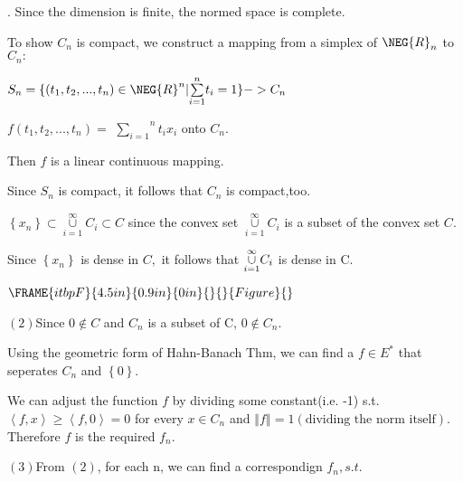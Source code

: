 \documentclass{article}
\begin{document}

. Since the dimension is finite, the normed space is complete.

To show $C_{n}$ is compact, we construct a mapping from a simplex of $\NEG%
{R}_{n}$ to $C_{n}:$

$S_{n}=\{\left( t_{1},t_{2},...,t_{n}\right) \in \NEG{R}^{n}|\overset{n}{%
\underset{i=1}{\sum }}t_{i}=1\}->C_{n}$

$f\left( t_{1},t_{2},...,t_{n}\right) =$ $\overset{n}{\underset{i=1}{\sum }}%
t_{i}x_{i}$ onto $C_{n}.$

Then $f$ is a linear continuous mapping.

Since $S_{n}$ is compact, it follows that $C_{n}$ is compact,too. 

$\left\{ x_{n}\right\} \subset \underset{i=1}{\overset{\infty }{\cup }}%
C_{i}\subset C$ since the convex set $\underset{i=1}{\overset{\infty }{\cup }%
}C_{i}$ is a subset of the convex set $C.$

Since $\left\{ x_{n}\right\} $ is dense in $C,$ it follows that $\underset{%
i=1}{\overset{\infty }{\cup }}C_{i}$ is dense in C.

$\FRAME{itbpF}{4.5in}{0.9in}{0in}{}{}{Figure}{\special{language "Scientific
Word";type "GRAPHIC";maintain-aspect-ratio TRUE;display "USEDEF";valid_file
"T";width 4.5in;height 0.9in;depth 0in;original-width
7.9321in;original-height 1.2496in;cropleft "0";croptop "1";cropright
"1";cropbottom "0";tempfilename 'NVOLAN01.wmf';tempfile-properties "XPR";}}$

$\left( 2\right) $Since $0\notin C$ and $C_{n}$ is a subset of C, 0$\notin
C_{n}.$

Using the geometric form of Hahn-Banach Thm, we can find a $f\in E^{\ast }$
that seperates $C_{n}$ and $\left\{ 0\right\} .$

We can adjust the function $f$ by dividing some constant(i.e. -1) s.t. $%
\left\langle f,x\right\rangle \geq \left\langle f,0\right\rangle =0$ for
every $x\in C_{n}$ and $\left\Vert f\right\Vert =1\left( \text{dividing the
norm itself}\right) .$Therefore $f$ is the required $f_{n}.$

$\left( 3\right) $From $\left( 2\right) $, for each n, we can find a
correspondign $f_{n},s.t.$
\end{document}
